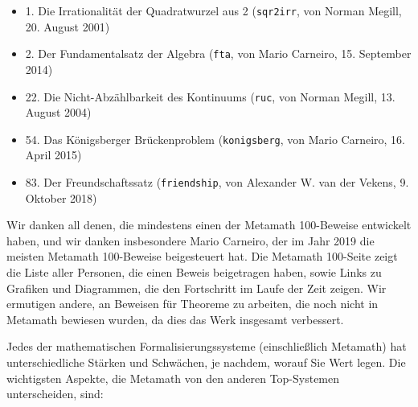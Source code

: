 \begin{flushleft}
\begin{itemize}
\item 1. Die Irrationalität der Quadratwurzel aus 2
  (\texttt{sqr2irr}, von Norman Megill, 20. August 2001)
\item 2. Der Fundamentalsatz der Algebra
  (\texttt{fta}, von Mario Carneiro, 15. September 2014)
\item 22. Die Nicht-Abzählbarkeit des Kontinuums
  (\texttt{ruc}, von Norman Megill, 13. August 2004)
\item 54. Das Königsberger Brückenproblem
  (\texttt{konigsberg}, von Mario Carneiro, 16. April 2015)
\item 83. Der Freundschaftssatz
  (\texttt{friendship}, von Alexander W. van der Vekens, 9. Oktober 2018)
\end{itemize}
\end{flushleft}

Wir danken all denen, die mindestens einen der Metamath 100-Beweise entwickelt haben, und wir danken insbesondere Mario Carneiro, der im Jahr 2019 die meisten Metamath 100-Beweise beigesteuert hat.
Die Metamath 100-Seite zeigt die Liste aller Personen, die einen Beweis beigetragen haben, sowie Links zu Grafiken und Diagrammen, die den Fortschritt im Laufe der Zeit zeigen.
Wir ermutigen andere, an Beweisen für Theoreme zu arbeiten, die noch nicht in Metamath bewiesen wurden, da dies das Werk insgesamt verbessert.

Jedes der mathematischen Formalisierungssysteme (einschließlich Metamath) hat unterschiedliche Stärken und Schwächen, je nachdem, worauf Sie Wert legen.
Die wichtigsten Aspekte, die Metamath von den anderen Top-Systemen unterscheiden, sind:

